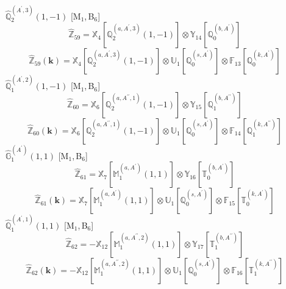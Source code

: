 \documentclass[fleqn,10pt,landscape]{article}
\begin{document}
\begin{itemize}
\vspace{4mm}
\noindent {} $\,\,\,\hat{\mathbb{Q}}_{2}^{(A^{\prime},3)}(1,-1)$ [M$_{1}$,\,B$_{6}$]
\begin{dmath*}
\hat{\mathbb{Z}}_{59}=\mathbb{X}_{4}[\mathbb{Q}_{2}^{(a,A^{\prime},3)}(1,-1)] \otimes\mathbb{Y}_{14}[\mathbb{Q}_{0}^{(b,A^{\prime})}]
\end{dmath*}
\begin{dmath*}
\hat{\mathbb{Z}}_{59}(\bm{k})=\mathbb{X}_{4}[\mathbb{Q}_{2}^{(a,A^{\prime},3)}(1,-1)] \otimes\mathbb{U}_{1}[\mathbb{Q}_{0}^{(s,A^{\prime})}] \otimes\mathbb{F}_{13}[\mathbb{Q}_{0}^{(k,A^{\prime})}]
\end{dmath*}
\vspace{4mm}
\noindent {} $\,\,\,\hat{\mathbb{Q}}_{1}^{(A^{\prime},2)}(1,-1)$ [M$_{1}$,\,B$_{6}$]
\begin{dmath*}
\hat{\mathbb{Z}}_{60}=\mathbb{X}_{6}[\mathbb{Q}_{2}^{(a,A^{\prime\prime},1)}(1,-1)] \otimes\mathbb{Y}_{15}[\mathbb{Q}_{1}^{(b,A^{\prime\prime})}]
\end{dmath*}
\begin{dmath*}
\hat{\mathbb{Z}}_{60}(\bm{k})=\mathbb{X}_{6}[\mathbb{Q}_{2}^{(a,A^{\prime\prime},1)}(1,-1)] \otimes\mathbb{U}_{1}[\mathbb{Q}_{0}^{(s,A^{\prime})}] \otimes\mathbb{F}_{14}[\mathbb{Q}_{1}^{(k,A^{\prime\prime})}]
\end{dmath*}
\vspace{4mm}
\noindent {} $\,\,\,\hat{\mathbb{G}}_{1}^{(A^{\prime})}(1,1)$ [M$_{1}$,\,B$_{6}$]
\begin{dmath*}
\hat{\mathbb{Z}}_{61}=\mathbb{X}_{7}[\mathbb{M}_{1}^{(a,A^{\prime})}(1,1)] \otimes\mathbb{Y}_{16}[\mathbb{T}_{0}^{(b,A^{\prime})}]
\end{dmath*}
\begin{dmath*}
\hat{\mathbb{Z}}_{61}(\bm{k})=\mathbb{X}_{7}[\mathbb{M}_{1}^{(a,A^{\prime})}(1,1)] \otimes\mathbb{U}_{1}[\mathbb{Q}_{0}^{(s,A^{\prime})}] \otimes\mathbb{F}_{15}[\mathbb{T}_{0}^{(k,A^{\prime})}]
\end{dmath*}
\vspace{4mm}
\noindent {} $\,\,\,\hat{\mathbb{Q}}_{1}^{(A^{\prime},1)}(1,1)$ [M$_{1}$,\,B$_{6}$]
\begin{dmath*}
\hat{\mathbb{Z}}_{62}=- \mathbb{X}_{12}[\mathbb{M}_{1}^{(a,A^{\prime\prime},2)}(1,1)] \otimes\mathbb{Y}_{17}[\mathbb{T}_{1}^{(b,A^{\prime\prime})}]
\end{dmath*}
\begin{dmath*}
\hat{\mathbb{Z}}_{62}(\bm{k})=- \mathbb{X}_{12}[\mathbb{M}_{1}^{(a,A^{\prime\prime},2)}(1,1)] \otimes\mathbb{U}_{1}[\mathbb{Q}_{0}^{(s,A^{\prime})}] \otimes\mathbb{F}_{16}[\mathbb{T}_{1}^{(k,A^{\prime\prime})}]

\end{dmath*}
\end{itemize}
\end{document}
